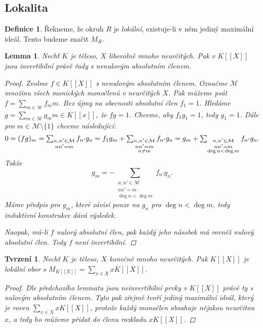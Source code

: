\documentclass[11pt,a4paper]{article}
\newcommand\p[1]{\mathcal{ #1 }} %
\newcommand*{\ml}[1]{\[\textstyle\let\displaystyle\textstyle#1\]}	%
\newcounter{numb}
\theoremstyle{definition}
\newtheorem*{definice}{Definice}
\theoremstyle{plain}
\newtheorem{lemma}[numb]{Lemma}
\newtheorem{tvrzeni}[numb]{Tvrzení}
\begin{document}
\subsection{Lokalita}

\begin{definice}
	Řekneme, že okruh $R$ je \emph{lokální}, existuje-li v něm jediný maximální ideál. Tento budeme značit $M_R$.
\end{definice}

\begin{lemma} \label{thm:KX_inv}
	Nechť $K$ je těleso, $X$ libovolně mnoho neurčitých. Pak v $K[[X]]$ jsou invertibilní právě řady s nenulovým absolutním členem.

	\begin{proof}
		Zvolme $f \in K[[X]]$ s nenulovým absolutním členem. Označme $\p M$ množinu všech monických monočlenů v neurčitých $X$. Pak můžeme psát $f = \sum_{m \in \p M} f_m m$. Bez újmy na obecnosti absolutní člen $f_1 = 1$. Hledáme $g = \sum_{m \in \p M} g_m m \in K[[x]]$, že $f g = 1$. Chceme, aby $f_1 g_1 = 1$, tedy $g_1 = 1$. Dále pro $m \in \p M \setminus \{1\}$ chceme následující:
		\ml{
			0 = (f g)_m = \sum_{\substack{n, n' \in \p M\\ n n' = m}} f_{n'} g_n = f_1 g_m + \sum_{\substack{n, n' \in \p M\\ n n' = m\\ n \not= m}} f_{n'} g_n = g_m + \sum_{\substack{n, n' \in \p M\\ n n' = m\\ \deg n < \deg m}} f_{n'} g_n.
		}
		Takže
		\begin{equation*} \label{eq:inv}
			\textstyle
			g_m = -\sum_{\substack{n, n' \in \p M\\ n n' = m\\ \deg n < \deg m}} f_{n'} g_n \tag{$\ast$}.
		\end{equation*}
		Máme předpis pro $g_m$, které závisí pouze na $g_n$ pro $\deg n < \deg m$, tedy induktivní konstrukce dává výsledek.

		Naopak, má-li $f$ nulový absolutní člen, pak každý jeho násobek má rovněž nulový absolutní člen. Tedy $f$ není invertibilní.
	\end{proof}
\end{lemma}

\begin{tvrzeni}
	Nechť $K$ je těleso, $X$ konečně mnoho neurčitých. Pak $K[[X]]$ je lokální obor s $M_{K[[X]]} = \sum_{x \in X} x K[[X]]$.

	\begin{proof}
		Dle předchozího lemmatu jsou neinvertibilní prvky v $K[[X]]$ právě ty s nulovým absolutním členem. Tyto pak zřejmě tvoří jediný maximální ideál, který je roven $\sum_{x \in X} x K[[X]]$, protože každý monočlen obsahuje nějakou neurčitou $x$, a tedy ho můžeme přidat do členu rozkladu $x K[[X]]$.
	\end{proof}
\end{tvrzeni}
\end{document}
